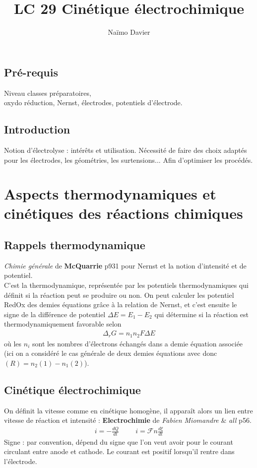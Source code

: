 \documentclass[12pt,prb,aps,epsf]{article}
\begin{document}
	
	\title{LC 29 Cinétique électrochimique}
	\author{Naïmo Davier}
	
	\maketitle
	
	\tableofcontents
	
	\pagebreak
	
	
\subsection{Pré-requis}
Niveau classes préparatoires,\\
oxydo réduction, Nernst, électrodes, potentiels d'électrode.

\subsection{Introduction}
Notion d'électrolyse : intérêts et utilisation. Nécessité de faire des choix adaptés pour les électrodes, les géométries, les surtensions... Afin d'optimiser les procédés.

\section{Aspects thermodynamiques et cinétiques des réactions chimiques}
\subsection{Rappels thermodynamique}
\textit{Chimie générale} de \textbf{McQuarrie} p931 pour Nernst et la notion d'intensité et de potentiel.\\

C'est la thermodynamique, représentée par les potentiels thermodynamiques qui définit si la réaction peut se produire ou non. On peut calculer les potentiel RedOx des demies équations grâce à la relation de Nernst, et c'est ensuite le signe de la différence de potentiel $\Delta E =E_1-E_2$ qui détermine si la réaction est thermodynamiquement favorable selon
\begin{eqnarray}
	\Delta_rG = n_1n_2F\Delta E
\end{eqnarray}
où les $n_i$ sont les nombres d'électrons échangés dans a demie équation associée (ici on a considéré le cas générale de deux demies équations avec donc $(R) = n_2(1) - n_1(2)$).

\subsection{Cinétique électrochimique}
On définit la vitesse comme en cinétique homogène, il apparaît alors un lien entre vitesse de réaction et intensité : \textbf{Electrochimie} de \textit{Fabien Miomandre} \& \textit{all} p56.
\begin{eqnarray}
i = -\frac{dQ}{dt} \hspace{1cm} i = \mathcal{F}n\frac{d\xi}{dt}
\end{eqnarray}
Signe : par convention, dépend du signe que l'on veut avoir pour le courant circulant entre anode et cathode. Le courant est positif lorsqu'il rentre dans l'électrode.
\end{document}

